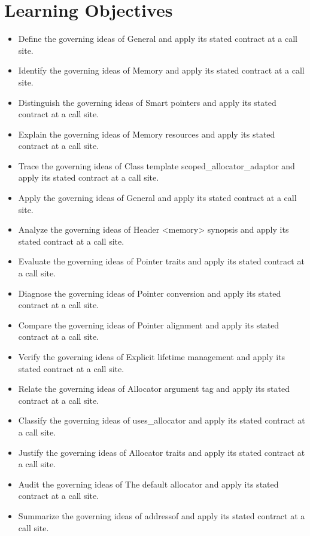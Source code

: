 \documentclass[11pt,letterpaper]{article}
\begin{document}
\section{Learning Objectives}
\begin{itemize}[label=\textcolor{CornellReferenceTeal}{$\blacktriangleright$}]
\item Define the governing ideas of General and apply its stated contract at a call site.
\item Identify the governing ideas of Memory and apply its stated contract at a call site.
\item Distinguish the governing ideas of Smart pointers and apply its stated contract at a call site.
\item Explain the governing ideas of Memory resources and apply its stated contract at a call site.
\item Trace the governing ideas of Class template scoped\_\allowbreak{}allocator\_\allowbreak{}adaptor and apply its stated contract at a call site.
\item Apply the governing ideas of General and apply its stated contract at a call site.
\item Analyze the governing ideas of Header <memory> synopsis and apply its stated contract at a call site.
\item Evaluate the governing ideas of Pointer traits and apply its stated contract at a call site.
\item Diagnose the governing ideas of Pointer conversion and apply its stated contract at a call site.
\item Compare the governing ideas of Pointer alignment and apply its stated contract at a call site.
\item Verify the governing ideas of Explicit lifetime management and apply its stated contract at a call site.
\item Relate the governing ideas of Allocator argument tag and apply its stated contract at a call site.
\item Classify the governing ideas of uses\_\allowbreak{}allocator and apply its stated contract at a call site.
\item Justify the governing ideas of Allocator traits and apply its stated contract at a call site.
\item Audit the governing ideas of The default allocator and apply its stated contract at a call site.
\item Summarize the governing ideas of addressof and apply its stated contract at a call site.
\end{itemize}
\end{document}
